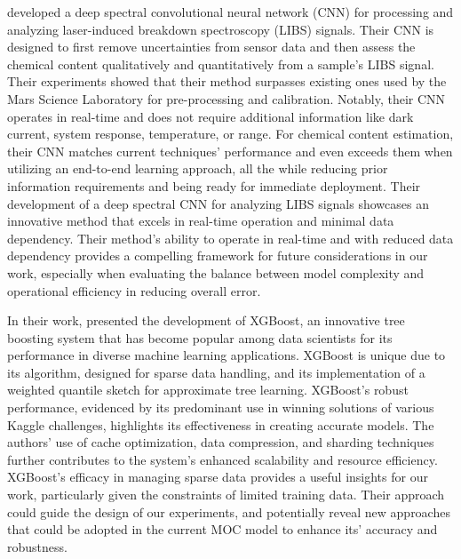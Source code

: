 \citeauthor{castorena_deep_2021} developed a deep spectral convolutional neural network (CNN) for processing and analyzing laser-induced breakdown spectroscopy (LIBS) signals.
Their CNN is designed to first remove uncertainties from sensor data and then assess the chemical content qualitatively and quantitatively from a sample's LIBS signal.
Their experiments showed that their method surpasses existing ones used by the Mars Science Laboratory for pre-processing and calibration.
Notably, their CNN operates in real-time and does not require additional information like dark current, system response, temperature, or range.
For chemical content estimation, their CNN matches current techniques' performance and even exceeds them when utilizing an end-to-end learning approach, all the while reducing prior information requirements and being ready for immediate deployment\cite{castorena_deep_2021}.
Their development of a deep spectral CNN for analyzing LIBS signals showcases an innovative method that excels in real-time operation and minimal data dependency. Their method's ability to operate in real-time and with reduced data dependency provides a compelling framework for future considerations in our work, especially when evaluating the balance between model complexity and operational efficiency in reducing overall error.

In their work, \citeauthor{chen_xgboost_2016} presented the development of XGBoost, an innovative tree boosting system that has become popular among data scientists for its performance in diverse machine learning applications. 
XGBoost is unique due to its algorithm, designed for sparse data handling, and its implementation of a weighted quantile sketch for approximate tree learning.
XGBoost's robust performance, evidenced by its predominant use in winning solutions of various Kaggle challenges, highlights its effectiveness in creating accurate models.
The authors' use of cache optimization, data compression, and sharding techniques further contributes to the system's enhanced scalability and resource efficiency\cite{chen_xgboost_2016}.
XGBoost's efficacy in managing sparse data provides a useful insights for our work, particularly given the constraints of limited training data. Their approach could guide the design of our experiments, and potentially reveal new approaches that could be adopted in the current MOC model to enhance its' accuracy and robustness.